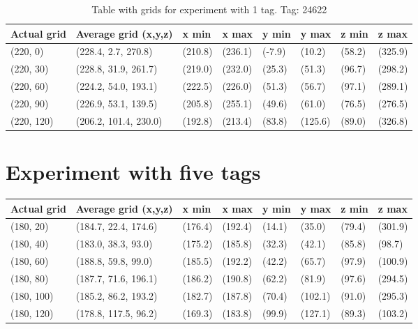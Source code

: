 \begin{table}[] 
    \begin{tabular}{|l|l|l|l|l|l|l|l|}
        \hline
        Actual grid & Average grid (x,y,z)   & x min   & x max   & y min    & y max   & z min   & z max    \\ \hline
        (220, 0)     & (228.4, 2.7, 270.8)      & (210.8)     & (236.1)    & (-7.9)     & (10.2)      & (58.2)     & (325.9)    \\ \hline
        (220, 30)     & (228.8, 31.9, 261.7)      & (219.0)     & (232.0)    & (25.3)     & (51.3)      & (96.7)     & (298.2)    \\ \hline
        (220, 60)     & (224.2, 54.0, 193.1)      & (222.5)     & (226.0)    & (51.3)     & (56.7)      & (97.1)     & (289.1)    \\ \hline
        (220, 90)     & (226.9, 53.1, 139.5)      & (205.8)     & (255.1)    & (49.6)     & (61.0)      & (76.5)     & (276.5)    \\ \hline
        (220, 120)     & (206.2, 101.4, 230.0)      & (192.8)     & (213.4)    & (83.8)     & (125.6)      & (89.0)     & (326.8)    \\ \hline
    \end{tabular}
    \caption{Table with grids for experiment with 1 tag. Tag: 24622}
    \label{Tab:three-tag-experiment-result-tag-24622}
\end{table}

\section{Experiment with five tags}

\begin{table}[] 
    \begin{tabular}{|l|l|l|l|l|l|l|l|}
    \hline
    Actual grid & Average grid (x,y,z)   & x min   & x max   & y min    & y max   & z min   & z max    \\ \hline
    (180, 20) 	& (184.7, 22.4, 174.6) 	 & (176.4) 	& (192.4)	& (14.1)	 & (35.0) 	 & (79.4)	 & (301.9)	\\ \hline
    (180, 40) 	& (183.0, 38.3, 93.0) 	 & (175.2) 	& (185.8)	& (32.3)	 & (42.1) 	 & (85.8)	 & (98.7)	\\ \hline
    (180, 60) 	& (188.8, 59.8, 99.0) 	 & (185.5) 	& (192.2)	& (42.2)	 & (65.7) 	 & (97.9)	 & (100.9)	\\ \hline
    (180, 80) 	& (187.7, 71.6, 196.1) 	 & (186.2) 	& (190.8)	& (62.2)	 & (81.9) 	 & (97.6)	 & (294.5)	\\ \hline
    (180, 100) 	& (185.2, 86.2, 193.2) 	 & (182.7) 	& (187.8)	& (70.4)	 & (102.1) 	 & (91.0)	 & (295.3)	\\ \hline
    (180, 120) 	& (178.8, 117.5, 96.2) 	 & (169.3) 	& (183.8)	& (99.9)	 & (127.1) 	 & (89.3)	 & (103.2)	\\ \hline
\end{tabular}
\label{Tab:one-tag-experiment-result}\end{table}